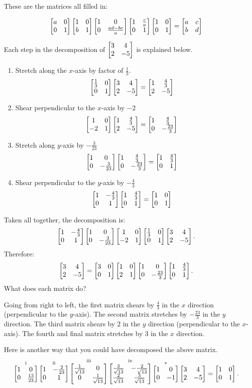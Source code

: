 \documentclass[../gatm_answers.tex]{subfiles}
\begin{document}
\begin{iinner_problem}
\begin{iinner_problem}
\begin{iinner_problem}
These are the matrices all filled in:

$$\begin{bmatrix} a & 0 \\ 0 & 1 \end{bmatrix}\begin{bmatrix} 1 & 0 \\ b & 1 \end{bmatrix}\begin{bmatrix} 1 & 0 \\ 0 & \frac{ad-bc}{a} \end{bmatrix}\begin{bmatrix} 1 & \frac{c}{a} \\ 0 & 1 \end{bmatrix}\begin{bmatrix} 1 & 0 \\ 0 & 1 \end{bmatrix} = \begin{bmatrix} a & c \\ b & d \end{bmatrix}$$

\begin{outer_problem}
\item \label{prob:needed_for_matrix_undo1}Each step in the decomposition of $\begin{bmatrix} 3 & 4 \\ 2 & -5 \end{bmatrix}$ is explained below.
\begin{multicols}{2}
\begin{enumerate}[label=(\roman*)]
\item Stretch along the $x$-axis by factor of $\frac{1}{3}$.
$$\begin{bmatrix} \frac{1}{3} & 0 \\ 0 & 1 \end{bmatrix}\begin{bmatrix} 3 & 4 \\ 2 & -5 \end{bmatrix}=\begin{bmatrix} 1 & \frac{4}{3} \\ 2 & -5 \end{bmatrix}$$
\item Shear perpendicular to the $x$-axis by $-2$
$$\begin{bmatrix} 1 & 0 \\ -2 & 1 \end{bmatrix}\begin{bmatrix} 1 & \frac{4}{3} \\ 2 & -5 \end{bmatrix}=\begin{bmatrix} 1 & \frac{4}{3} \\ 0 & -\frac{23}{3} \end{bmatrix}$$
\item Stretch along $y$-axis by $-\frac{3}{23}$
$$\begin{bmatrix} 1 & 0 \\ 0 & -\frac{3}{23} \end{bmatrix}\begin{bmatrix} 1 & \frac{4}{3} \\ 0 & -\frac{23}{3} \end{bmatrix}=\begin{bmatrix} 1 & \frac{4}{3} \\ 0 & 1 \end{bmatrix}$$
\item Shear perpendicular to the $y$-axis by $-\frac{4}{3}$
$$\begin{bmatrix} 1 & -\frac{4}{3} \\ 0 & 1 \end{bmatrix}\begin{bmatrix} 1 & \frac{4}{3} \\ 0 & 1 \end{bmatrix}=\begin{bmatrix} 1 & 0 \\ 0 & 1 \end{bmatrix}$$
\end{enumerate}
\end{multicols}
Taken all together, the decomposition is:
$$\begin{bmatrix} 1 & -\frac{4}{3} \\ 0 & 1 \end{bmatrix}\begin{bmatrix} 1 & 0 \\ 0 & -\frac{3}{23} \end{bmatrix}\begin{bmatrix} 1 & 0 \\ -2 & 1 \end{bmatrix}\begin{bmatrix} \frac{1}{3} & 0 \\ 0 & 1 \end{bmatrix}\begin{bmatrix} 3 & 4 \\ 2 & -5 \end{bmatrix}.$$
Therefore: $$\begin{bmatrix} 3 & 4 \\ 2 & -5 \end{bmatrix}=\begin{bmatrix} 3 & 0 \\ 0 & 1 \end{bmatrix}\begin{bmatrix} 1 & 0 \\ 2 & 1 \end{bmatrix}\begin{bmatrix} 1 & 0 \\ 0 & -\frac{23}{3} \end{bmatrix}\begin{bmatrix} 1 & \frac{4}{3} \\ 0 & 1 \end{bmatrix}.$$ What does each matrix do?
\end{outer_problem}

Going from right to left, the first matrix shears by $\frac{4}{3}$ in the $x$ direction (perpendicular to the $y$-axis). The second matrix stretches by $-\frac{23}{3}$ in the $y$ direction. The third matrix shears by $2$ in the $y$ direction (perpendicular to the $x$-axis). The fourth and final matrix stretches by $3$ in the $x$ direction.

\begin{outer_problem}
\setcounter{problem_i}{\value{outer_problemi}}
\item\label{prob:needed_for_matrix_undo2}Here is another way that you could have decomposed the above matrix.
\vspace{-2ex}
$$\mathop{\begin{bmatrix} 1 & 0 \\ 0 & \frac{13}{23} \end{bmatrix}}^{\text{i}}
\mathop{\begin{bmatrix} 1 & -\frac{2}{23} \\ 0 & 1 \end{bmatrix}}^{\text{ii}}
\mathop{\begin{bmatrix} \frac{1}{\sqrt{13}} & 0 \\ 0 & \frac{1}{\sqrt{13}} \end{bmatrix}}^{\text{iii}}
\mathop{\begin{bmatrix} \frac{3}{\sqrt{13}} & -\frac{2}{\sqrt{13}} \\ \frac{2}{\sqrt{13}} & \frac{3}{\sqrt{13}} \end{bmatrix}}^{\text{iv}}
\mathop{\begin{bmatrix} 1 & 0 \\ 0 & -1 \end{bmatrix}}^{\text{v}}
\begin{bmatrix} 3 & 4 \\ 2 & -5 \end{bmatrix}=\begin{bmatrix} 1 & 0 \\ 0 & 1 \end{bmatrix}.$$
\end{outer_problem}


\end{iinner_problem}
\end{iinner_problem}
\end{iinner_problem}
\end{document}
